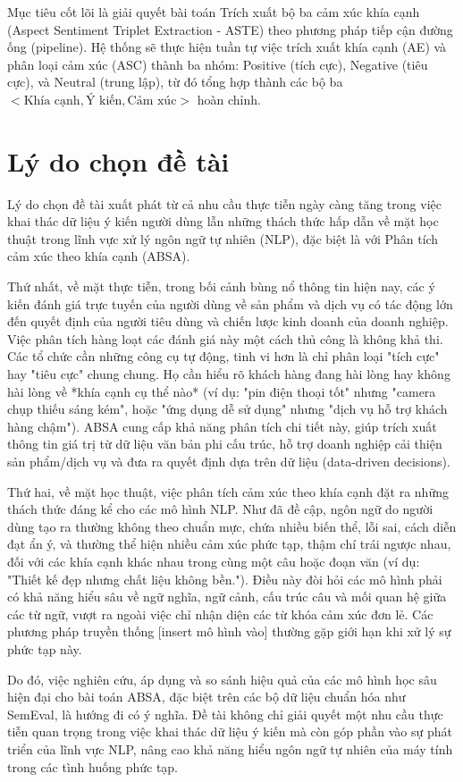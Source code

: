 \documentclass[12pt,a4paper]{report}
\begin{document}
Mục tiêu cốt lõi là giải quyết bài toán Trích xuất bộ ba cảm xúc khía cạnh (Aspect Sentiment Triplet Extraction - ASTE) theo phương pháp tiếp cận đường ống (pipeline). Hệ thống sẽ thực hiện tuần tự việc trích xuất khía cạnh (AE) và phân loại cảm xúc (ASC) thành ba nhóm: Positive (tích cực), Negative (tiêu cực), và Neutral (trung lập), từ đó tổng hợp thành các bộ ba $< \text{Khía cạnh}, \text{Ý kiến}, \text{Cảm xúc} >$ hoàn chỉnh. 
\section{Lý do chọn đề tài}
Lý do chọn đề tài xuất phát từ cả nhu cầu thực tiễn ngày càng tăng trong việc khai thác dữ liệu ý kiến người dùng lẫn những thách thức hấp dẫn về mặt học thuật trong lĩnh vực xử lý ngôn ngữ tự nhiên (NLP), đặc biệt là với Phân tích cảm xúc theo khía cạnh (ABSA).

Thứ nhất, về mặt thực tiễn, trong bối cảnh bùng nổ thông tin hiện nay, các ý kiến đánh giá trực tuyến của người dùng về sản phẩm và dịch vụ  có tác động lớn đến quyết định của người tiêu dùng và chiến lược kinh doanh của doanh nghiệp. Việc phân tích hàng loạt các đánh giá này một cách thủ công là không khả thi. Các tổ chức cần những công cụ tự động, tinh vi hơn là chỉ phân loại "tích cực" hay "tiêu cực" chung chung. Họ cần hiểu rõ khách hàng đang hài lòng hay không hài lòng về *khía cạnh cụ thể nào* (ví dụ: "pin điện thoại tốt" nhưng "camera chụp thiếu sáng kém", hoặc "ứng dụng dễ sử dụng" nhưng "dịch vụ hỗ trợ khách hàng chậm"). ABSA cung cấp khả năng phân tích chi tiết này, giúp trích xuất thông tin giá trị từ dữ liệu văn bản phi cấu trúc, hỗ trợ doanh nghiệp cải thiện sản phẩm/dịch vụ và đưa ra quyết định dựa trên dữ liệu (data-driven decisions).

Thứ hai, về mặt học thuật, việc phân tích cảm xúc theo khía cạnh đặt ra những thách thức đáng kể cho các mô hình NLP. Như đã đề cập, ngôn ngữ do người dùng tạo ra thường không theo chuẩn mực, chứa nhiều biến thể, lỗi sai, cách diễn đạt ẩn ý, và thường thể hiện nhiều cảm xúc phức tạp, thậm chí trái ngược nhau, đối với các khía cạnh khác nhau trong cùng một câu hoặc đoạn văn (ví dụ: "Thiết kế đẹp nhưng chất liệu không bền."). Điều này đòi hỏi các mô hình phải có khả năng hiểu sâu về ngữ nghĩa, ngữ cảnh, cấu trúc câu và mối quan hệ giữa các từ ngữ, vượt ra ngoài việc chỉ nhận diện các từ khóa cảm xúc đơn lẻ. Các phương pháp truyền thống [insert mô hình vào] thường gặp giới hạn khi xử lý sự phức tạp này.

Do đó, việc nghiên cứu, áp dụng và so sánh hiệu quả của các mô hình học sâu hiện đại cho bài toán ABSA, đặc biệt trên các bộ dữ liệu chuẩn hóa như SemEval, là hướng đi có ý nghĩa. Đề tài không chỉ giải quyết một nhu cầu thực tiễn quan trọng trong việc khai thác dữ liệu ý kiến mà còn góp phần vào sự phát triển của lĩnh vực NLP, nâng cao khả năng hiểu ngôn ngữ tự nhiên của máy tính trong các tình huống phức tạp.
\end{document}
